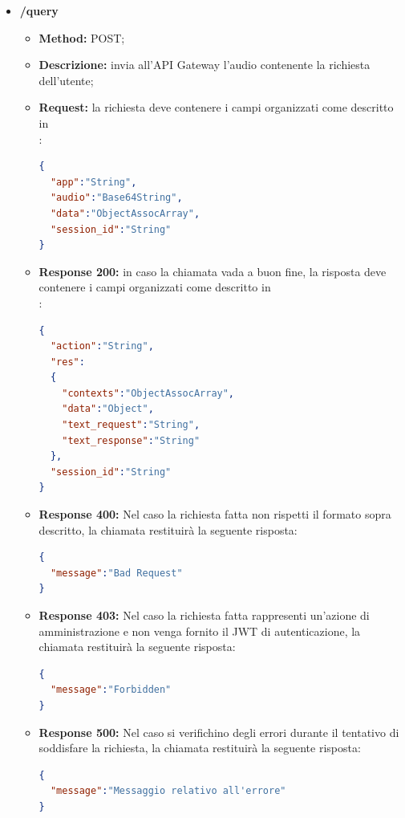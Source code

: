 	\begin{itemize}
		\item \textbf{/query}\\
		\begin{itemize}
			\item \textbf{Method:} POST;
			\item \textbf{Descrizione:} invia all'API Gateway l'audio contenente la richiesta dell'utente;
			\item \textbf{Request:} la richiesta deve contenere i campi organizzati come descritto in \\:
\begin{lstlisting}[language=json,firstnumber=1]
{
  "app":"String",
  "audio":"Base64String",
  "data":"ObjectAssocArray",
  "session_id":"String"
}
\end{lstlisting}
\item \textbf{Response 200:} in caso la chiamata vada a buon fine, la risposta deve contenere i campi organizzati come descritto in \\:
\begin{lstlisting}[language=json,firstnumber=1]
{
  "action":"String",
  "res":
  {
    "contexts":"ObjectAssocArray",
    "data":"Object",
    "text_request":"String",
    "text_response":"String"
  },
  "session_id":"String"
}
\end{lstlisting}
\item \textbf{Response 400:} Nel caso la richiesta fatta non rispetti il formato sopra descritto, la chiamata restituirà la seguente risposta:
\begin{lstlisting}[language=json,firstnumber=1]
{
  "message":"Bad Request"
}
\end{lstlisting}
\item \textbf{Response 403:} Nel caso la richiesta fatta rappresenti un'azione di amministrazione e non venga fornito il JWT di autenticazione, la chiamata restituirà la seguente risposta:
\begin{lstlisting}[language=json,firstnumber=1]
{
  "message":"Forbidden"
}
\end{lstlisting}
\item \textbf{Response 500:} Nel caso si verifichino degli errori durante il tentativo di soddisfare la richiesta, la chiamata restituirà la seguente risposta:
\begin{lstlisting}[language=json,firstnumber=1]
{
  "message":"Messaggio relativo all'errore"
}
\end{lstlisting}
\end{itemize}
\end{itemize}

